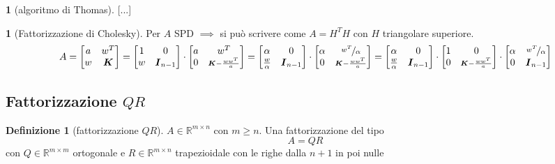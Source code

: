 \documentclass[a4paper,10pt]{article}
\theoremstyle{definition}
\newcommand{\re}{\mathbb{R}} %
\theoremstyle{indentdefinition}
\newtheorem{defn}{Definizione}[section]
\theoremstyle{indenttheorem}
\theoremstyle{myremark}
\theoremstyle{indentgeneral}
\newtheorem{lyxalgorithm}[thm]{\protect\algorithmname}
\theoremstyle{plain}
\theoremstyle{plain}
\begin{document}
\begin{lyxalgorithm}[algoritmo di Thomas]
{[}...{]}
\end{lyxalgorithm}

\begin{lyxalgorithm}[Fattorizzazione di Cholesky]
Per $A$ SPD $\implies$ si può scrivere come $A=H^TH$ con $H$ triangolare superiore.
\[
A=\begin{bmatrix}a & w^{T}\\
w & \boldsymbol{K}
\end{bmatrix}=\begin{bmatrix}1 & 0\\
w & \boldsymbol{I}_{n-1}
\end{bmatrix}\cdot\begin{bmatrix}a & w^{T}\\
0 & {\scriptstyle \boldsymbol{K}-\frac{ww^{T}}{a}}
\end{bmatrix}=\begin{bmatrix}\alpha & 0\\
\frac{w}{\alpha} & \boldsymbol{I}_{n-1}
\end{bmatrix}\cdot\begin{bmatrix}\alpha & \nicefrac{w^{T}}{\alpha}\\
0 & {\scriptstyle \boldsymbol{K}-\frac{ww^{T}}{a}}
\end{bmatrix}=\begin{bmatrix}\alpha & 0\\
\frac{w}{\alpha} & \boldsymbol{I}_{n-1}
\end{bmatrix}\cdot\begin{bmatrix}1 & 0\\
0 & {\scriptstyle \boldsymbol{K}-\frac{ww^{T}}{a}}
\end{bmatrix}\cdot\begin{bmatrix}\alpha & \nicefrac{w^{T}}{\alpha}\\
0 & \boldsymbol{I}_{n-1}
\end{bmatrix}
\]
\end{lyxalgorithm}


\subsection{Fattorizzazione $QR$}
\begin{defn}[fattorizzazione $QR$]
\label{def:fattorizzazione-QR}$A\in\re^{m\times n}$ con $m\ge n$. Una fattorizzazione del tipo $$A=QR$$ con
$Q\in\mathbb{R}^{m\times m}$ ortogonale e $R\in\mathbb{R}^{m\times n}$
trapezioidale con le righe dalla $n+1$ in poi nulle 
\end{defn}
\end{document}
